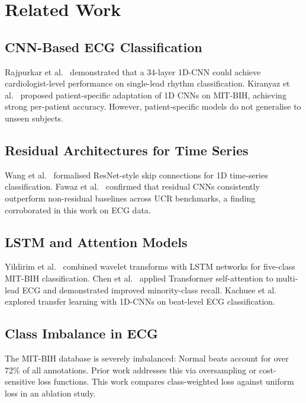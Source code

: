 \documentclass[conference]{IEEEtran}
\begin{document}
\section{Related Work}

\subsection{CNN-Based ECG Classification}

Rajpurkar et al.\ \cite{b7} demonstrated that a 34-layer 1D-CNN could achieve cardiologist-level performance on single-lead rhythm classification. Kiranyaz et al.\ \cite{b8} proposed patient-specific adaptation of 1D CNNs on MIT-BIH, achieving strong per-patient accuracy. However, patient-specific models do not generalise to unseen subjects.

\subsection{Residual Architectures for Time Series}

Wang et al.\ \cite{b9} formalised ResNet-style skip connections for 1D time-series classification. Fawaz et al.\ \cite{b10} confirmed that residual CNNs consistently outperform non-residual baselines across UCR benchmarks, a finding corroborated in this work on ECG data.

\subsection{LSTM and Attention Models}

Yildirim et al.\ \cite{b11} combined wavelet transforms with LSTM networks for five-class MIT-BIH classification. Chen et al.\ \cite{b12} applied Transformer self-attention to multi-lead ECG and demonstrated improved minority-class recall. Kachuee et al.\ \cite{b13} explored transfer learning with 1D-CNNs on beat-level ECG classification.

\subsection{Class Imbalance in ECG}

The MIT-BIH database is severely imbalanced: Normal beats account for over 72\% of all annotations. Prior work addresses this via oversampling \cite{b13} or cost-sensitive loss functions. This work compares class-weighted loss against uniform loss in an ablation study.
\end{document}
